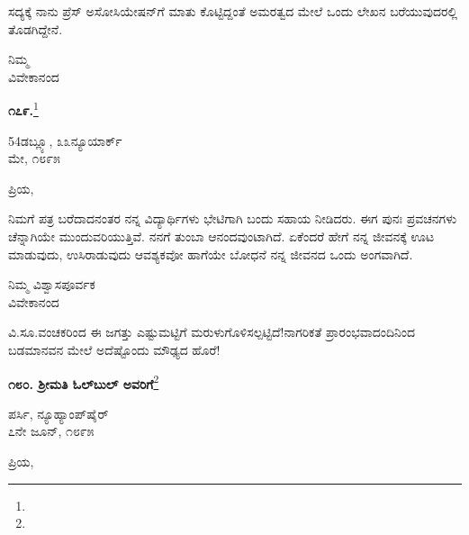 ಸದ್ಯಕ್ಕೆ ನಾನು ಪ್ರೆಸ್ ಅಸೋಸಿಯೇಷನ್‌ಗೆ ಮಾತು ಕೊಟ್ಟಿದ್ದಂತೆ ಅಮರತ್ವದ ಮೇಲೆ ಒಂದು ಲೇಖನ ಬರೆಯುವುದರಲ್ಲಿ ತೊಡಗಿದ್ದೇನೆ.

\vspace{-0.5cm}

{\flushright
ನಿಮ್ಮ\\ವಿವೇಕಾನಂದ\par}

\begin{center}
\textbf{೧೭೯.}\footnote{}
\end{center}

\vspace{-0.7cm}

\begin{flushright}
54\enginline{-}ಡಬ್ಲ್ಯೂ, ೩೩\enginline{-}ನ್ಯೂಯಾರ್ಕ್\\ಮೇ, ೧೮೯೫
\end{flushright}

\noindent
ಪ್ರಿಯ,

ನಿಮಗೆ ಪತ್ರ ಬರೆದಾದನಂತರ ನನ್ನ ವಿದ್ಯಾರ್ಥಿಗಳು ಭೇಟಿಗಾಗಿ ಬಂದು ಸಹಾಯ ನೀಡಿದರು. ಈಗ ಪುನಃ ಪ್ರವಚನಗಳು ಚೆನ್ನಾಗಿಯೇ ಮುಂದುವರಿಯುತ್ತಿವೆ. ನನಗೆ ತುಂಬಾ ಆನಂದವುಂಟಾಗಿದೆ. ಏಕೆಂದರೆ ಹೇಗೆ ನನ್ನ ಜೀವನಕ್ಕೆ ಊಟ ಮಾಡುವುದು, ಉಸಿರಾಡುವುದು ಆವಶ್ಯಕವೋ ಹಾಗೆಯೇ ಬೋಧನೆ ನನ್ನ ಜೀವನದ ಒಂದು ಅಂಗವಾಗಿದೆ.

\vspace{-0.4cm}

\begin{flushright}
ನಿಮ್ಮ ವಿಶ್ವಾಸಪೂರ್ವಕ\\ವಿವೇಕಾನಂದ
\end{flushright}

\vspace{-0.4cm}

ವಿ.ಸೂ.\enginline{-}ವಂಚಕರಿಂದ ಈ ಜಗತ್ತು ಎಷ್ಟುಮಟ್ಟಿಗೆ ಮರುಳುಗೊಳಿಸಲ್ಪಟ್ಟಿದೆ!ನಾಗರಿಕತೆ ಪ್ರಾರಂಭವಾದಂದಿನಿಂದ ಬಡಮಾನವನ ಮೇಲೆ ಅದೆಷ್ಟೊಂದು ಮೌಢ್ಯದ ಹೊರೆ!

\begin{center}
\textbf{೧೮೦. ಶ‍್ರೀಮತಿ ಓಲ್‌ಬುಲ್ ಅವರಿಗೆ}\footnote{}
\end{center}

\vspace{-0.7cm}

\begin{flushright}
ಪರ್ಸಿ, ನ್ಯೂಹ್ಯಾಂಪ್‌ಷೈರ್\\೭ನೇ ಜೂನ್, ೧೮೯೫
\end{flushright}

\vspace{-0.5cm}

\noindent
ಪ್ರಿಯ,

